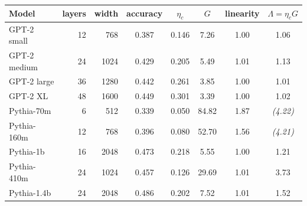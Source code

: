 \begin{tabular}{lrrccccc}
\toprule
Model & layers & width & accuracy & $\eta_c$ & $G$ & linearity & $\Lambda=\eta_c G$ \\
\midrule
GPT-2 small & 12 & 768 & 0.387 & 0.146 & 7.26 & 1.00 & 1.06 \\
GPT-2 medium & 24 & 1024 & 0.429 & 0.205 & 5.49 & 1.01 & 1.13 \\
GPT-2 large & 36 & 1280 & 0.442 & 0.261 & 3.85 & 1.00 & 1.01 \\
GPT-2 XL & 48 & 1600 & 0.449 & 0.301 & 3.39 & 1.00 & 1.02 \\
Pythia-70m & 6 & 512 & 0.339 & 0.050 & 84.82 & 1.87 & \textit{(4.22)} \\
Pythia-160m & 12 & 768 & 0.396 & 0.080 & 52.70 & 1.56 & \textit{(4.21)} \\
Pythia-1b & 16 & 2048 & 0.473 & 0.218 & 5.55 & 1.00 & 1.21 \\
Pythia-410m & 24 & 1024 & 0.457 & 0.126 & 29.69 & 1.01 & 3.73 \\
Pythia-1.4b & 24 & 2048 & 0.486 & 0.202 & 7.52 & 1.01 & 1.52 \\
\bottomrule
\end{tabular}
